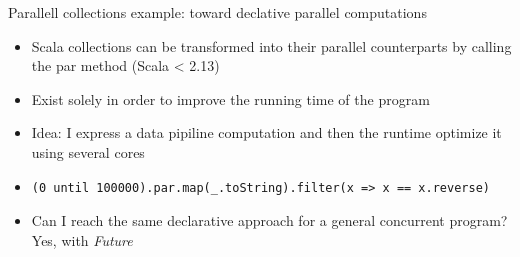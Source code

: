 \documentclass[presentation, 9pt]{beamer}\mode<presentation>{\usetheme{AMSBolognaFC}}
\begin{document}
\begin{frame}[fragile]{Parallell collections example: toward declative parallel computations}
	\begin{itemize}
		\item Scala collections can be transformed into their parallel counterparts by calling the par
		method (Scala < 2.13)
		\item Exist solely in order to improve the running time of the program
  	\item Idea: I express a data pipiline computation and then the runtime optimize it using several cores
		\item[] \begin{tcolorbox}[left=0pt, top=0pt, bottom=0pt]
			\begin{verbatim}
(0 until 100000).par.map(_.toString).filter(x => x == x.reverse)
			\end{verbatim}
		\end{tcolorbox}
		\item Can I reach the same declarative approach for a general concurrent program? Yes, with \emph{Future} 
	\end{itemize}
\end{frame}
\end{document}
